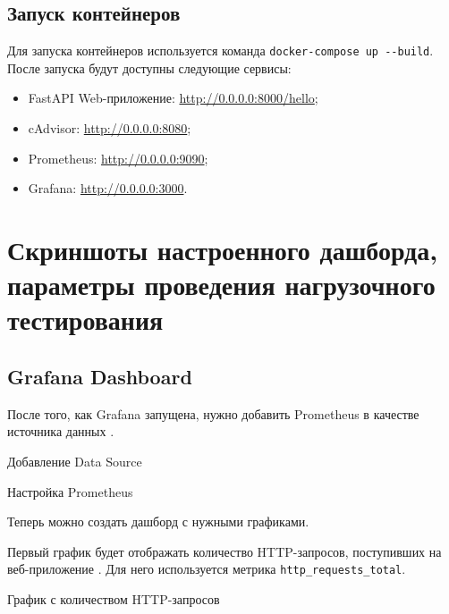 \subsection{Запуск контейнеров}

Для запуска контейнеров используется команда \verb|docker-compose up --build|.
После запуска будут доступны следующие сервисы:

\begin{itemize}
	\item FastAPI Web-приложение: \url{http://0.0.0.0:8000/hello};
	\item cAdvisor: \url{http://0.0.0.0:8080};
	\item Prometheus: \url{http://0.0.0.0:9090};
	\item Grafana: \url{http://0.0.0.0:3000}.
\end{itemize}


\section{Скриншоты настроенного дашборда,
	параметры проведения нагрузочного тестирования}

\subsection{Grafana Dashboard}

После того, как Grafana запущена, нужно добавить Prometheus
в качестве источника данных .

\begin{image}
    \caption{Добавление Data Source}
    \label{fig:data-source:add}
\end{image}

\begin{image}
    \caption{Настройка Prometheus}
    \label{fig:prometheus:create}
\end{image}

Теперь можно создать дашборд с нужными графиками.\par
Первый график будет отображать количество HTTP-запросов,
поступивших на веб-приложение .
Для него используется метрика \verb|http_requests_total|.

\begin{image}
    \caption{График с количеством HTTP-запросов}
    \label{fig:graph:requests}
\end{image}

